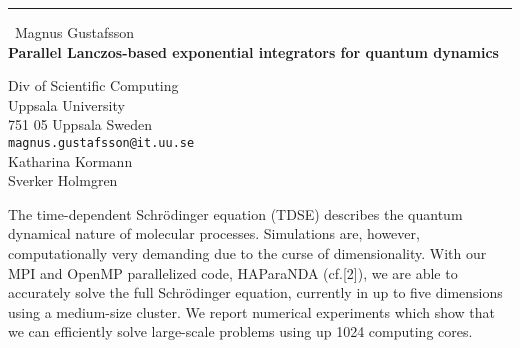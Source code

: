 \documentclass{report}
\begin{document}
\begin{center}
\rule{6in}{1pt} \
{\large Magnus Gustafsson \\
{\bf Parallel Lanczos-based exponential integrators for quantum dynamics}}

Div of Scientific Computing \\ Uppsala University \\ 751 05 Uppsala Sweden
\\
{\tt magnus.gustafsson@it.uu.se}\\
Katharina Kormann\\
Sverker Holmgren\end{center}

The time-dependent Schr{\"o}dinger equation (TDSE) describes the quantum
dynamical nature of molecular processes. Simulations are, however,
computationally very demanding due to the curse of dimensionality. With
our MPI and OpenMP parallelized code, HAParaNDA (cf.[2]), we are able to
accurately solve the full Schr{\"o}dinger equation, currently in up to
five dimensions using a medium-size cluster. We report numerical
experiments which show that we can efficiently solve large-scale problems
using up 1024 computing cores.
\end{document}
